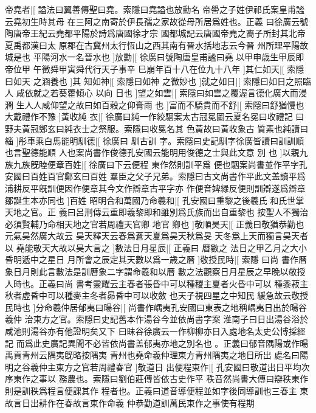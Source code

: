 帝堯者|[%
謚法曰翼善傳聖曰堯。索隱曰堯謚也放勳名%
帝嚳之子姓伊祁氏案皇甫謐云堯初生時其母%
%
在三阿之南寄於伊長孺之家故從母所居爲姓也。正義%
曰徐廣云號陶唐帝王紀云堯都平陽於詩爲唐國徐才宗%
%
國都城記云唐國帝堯之裔子所封其北帝夏禹都漢曰太%
原郡在古冀州太行恆山之西其南有晉水括地志云今晉%
%
州所理平陽故城是也%
平陽河水一名晉水也%
]放勳|[%
徐廣曰號陶唐皇甫謐曰堯%
以甲申歳生甲辰即帝位甲%
%
午徵舜甲寅舜代行天子事辛%
巳崩年百十八在位九十八年%
]其仁如天|[%
索隱曰如天%
之涵養也%
]其%
%
知如神|[%
索隱曰如神%
之微妙也%
]就之如日|[%
索隱曰如日之照臨人%
咸依就之若葵藿傾心%
%
以向%
日也%
]望之如雲|[%
索隱曰如雲之覆渥言德化廣大而浸潤%
生人人咸仰望之故曰如百穀之仰膏雨%
%
也%
]富而不驕貴而不舒|[%
索隱曰舒猶慢也%
大戴禮作不豫%
]黃收純%
%
衣|[%
徐廣曰純一作絞駰案太古冠冕圖云夏名冕曰收禮記%
曰野夫黃冠鄭玄曰純衣士之祭服。索隱曰收冕名其%
色黃故曰黃收象古%
質素也純讀曰緇%
]彤車乘白馬能明馴德|[%
徐廣曰%
馴古訓%
%
字。索隱曰史記馴字徐廣皆讀曰訓訓順也言聖德能順%
人也案尚書作俊德孔安國云能明用俊德之士與此文意%
%
別%
也%
]以親九族九族旣睦便章百姓|[%
徐廣曰下云便程%
東作然則訓平爲%
%
便也駰案尚書並作平字孔安國曰百姓百官鄭玄曰百姓%
羣臣之父子兄弟。索隱曰古文尚書作平此文盖讀平爲%
%
浦耕反平旣訓便因作便章其今文作辯章古平字亦%
作便音婢緑反便則訓辯遂爲辯章鄒誕生本亦同也%
]百姓%
%
昭明合和萬國乃命羲和|[%
孔安國曰重黎之後羲氏%
和氏世掌天地之官。正%
%
義曰呂刑傳云重即羲黎即和雖別爲氏族而出自重黎也%
按聖人不獨治必須賢輔乃命相天地之官若周禮天官卿%
%
地官%
卿也%
]敬順昊天|[%
正義曰敬猶恭勤也元氣昊然廣大故云%
昊天釋天云春爲蒼天夏爲昊天秋爲旻%
%
天冬爲上天而獨言昊天者以%
堯能敬天大故以昊大言之%
]數法日月星辰|[%
正義曰%
曆數之%
%
法日之甲乙月之大小昏明遞中之星日%
月所會之辰定其天數以爲一歳之曆%
]敬授民時|[%
索隱%
曰尚%
%
書作曆象日月則此言數法是訓曆象二字謂命羲和以曆%
數之法觀察日月星辰之早晚以敬授人時也。正義曰尚%
%
書考靈耀云主春者張昏中可以種稷主夏者火昏中可以%
種黍菽主秋者虛昏中可以種麥主冬者昴昏中可以收斂%
%
也天子視四星之中知民%
緩急故云敬授民時也%
]分命羲仲居郁夷曰暘谷|[%
%
尚書作嵎夷孔安國曰東表之地稱嵎夷日出於暘谷羲仲%
治東方之官。索隱曰史記舊本作湯谷今並依尚書字案%
%
淮南子曰日出湯谷浴於咸池則湯谷亦有他證明矣又下%
曰昧谷徐廣云一作柳柳亦日入處地名太史公博採經記%
%
而爲此史廣記異聞不必皆依尚書盖郁夷亦地之別名也%
。正義曰郁音隅陽或作暘禹貢青州云隅夷旣略按隅夷%
%
青州也堯命羲仲理東方青州隅夷之地日所出%
處名曰陽明之谷羲仲主東方之官若周禮春官%
]敬道日%
%
出便程東作|[%
孔安國曰敬道出日平均次序東作之事以%
務農也。索隱曰劉伯莊傳皆依古史作平%
%
秩音然尚書大傳曰辯秩東作則是訓秩爲程言便課其作%
程者也。正義曰道音導便程並如字後同導訓也三春主%
%
東故言日出耕作在春故言東作命羲%
仲恭勤道訓萬民東作之事使有程期%
